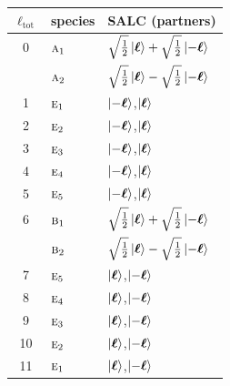 \documentclass[11pt]{article}
\newcommand{\irr}[1]{\text{\normalfont\scshape #1}}
\begin{document}
\begin{longtable}{c l l}\hline $\ell_{\mathrm{tot}}$ & species & SALC (partners)\\ \hline\endhead

0 & $\irr{a}_{1}$ & $\sqrt{\tfrac{1}{2}}\ket{\boldsymbol\ell}+\sqrt{\tfrac{1}{2}}\ket{-\boldsymbol\ell}$\\

 & $\irr{a}_{2}$ & $\sqrt{\tfrac{1}{2}}\ket{\boldsymbol\ell}-\sqrt{\tfrac{1}{2}}\ket{-\boldsymbol\ell}$\\

1 & $\irr{e}_{1}$ & $\ket{-\boldsymbol\ell}$,\quad $\ket{\boldsymbol\ell}$\\

2 & $\irr{e}_{2}$ & $\ket{-\boldsymbol\ell}$,\quad $\ket{\boldsymbol\ell}$\\

3 & $\irr{e}_{3}$ & $\ket{-\boldsymbol\ell}$,\quad $\ket{\boldsymbol\ell}$\\

4 & $\irr{e}_{4}$ & $\ket{-\boldsymbol\ell}$,\quad $\ket{\boldsymbol\ell}$\\

5 & $\irr{e}_{5}$ & $\ket{-\boldsymbol\ell}$,\quad $\ket{\boldsymbol\ell}$\\

6 & $\irr{b}_{1}$ & $\sqrt{\tfrac{1}{2}}\ket{\boldsymbol\ell}+\sqrt{\tfrac{1}{2}}\ket{-\boldsymbol\ell}$\\

 & $\irr{b}_{2}$ & $\sqrt{\tfrac{1}{2}}\ket{\boldsymbol\ell}-\sqrt{\tfrac{1}{2}}\ket{-\boldsymbol\ell}$\\

7 & $\irr{e}_{5}$ & $\ket{\boldsymbol\ell}$,\quad $\ket{-\boldsymbol\ell}$\\

8 & $\irr{e}_{4}$ & $\ket{\boldsymbol\ell}$,\quad $\ket{-\boldsymbol\ell}$\\

9 & $\irr{e}_{3}$ & $\ket{\boldsymbol\ell}$,\quad $\ket{-\boldsymbol\ell}$\\

10 & $\irr{e}_{2}$ & $\ket{\boldsymbol\ell}$,\quad $\ket{-\boldsymbol\ell}$\\

11 & $\irr{e}_{1}$ & $\ket{\boldsymbol\ell}$,\quad $\ket{-\boldsymbol\ell}$\\

\hline\end{longtable}
\end{document}
